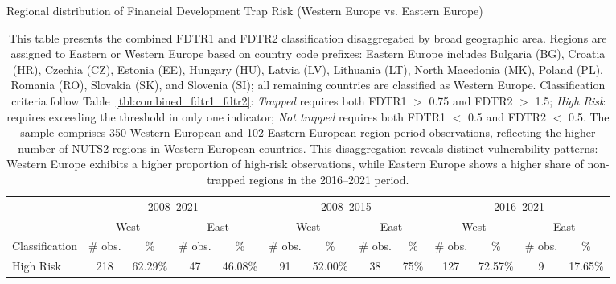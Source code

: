 \documentclass[a4paper,11pt,oneside]{article}
\begin{document}
\begin{table}%
\centering
\caption{Regional distribution of Financial Development Trap Risk (Western Europe vs. Eastern Europe)}
\vspace{-2mm}
\caption*{\footnotesize This table presents the combined FDTR1 and FDTR2 classification disaggregated by broad geographic area. Regions are assigned to Eastern or Western Europe based on country code prefixes: Eastern Europe includes Bulgaria (BG), Croatia (HR), Czechia (CZ), Estonia (EE), Hungary (HU), Latvia (LV), Lithuania (LT), North Macedonia (MK), Poland (PL), Romania (RO), Slovakia (SK), and Slovenia (SI); all remaining countries are classified as Western Europe. Classification criteria follow Table~\ref{tbl:combined_fdtr1_fdtr2}: \textit{Trapped} requires both FDTR1 $>$ 0.75 and FDTR2 $>$ 1.5; \textit{High Risk} requires exceeding the threshold in only one indicator; \textit{Not trapped} requires both FDTR1 $<$ 0.5 and FDTR2 $<$ 0.5. The sample comprises 350 Western European and 102 Eastern European region-period observations, reflecting the higher number of NUTS2 regions in Western European countries. This disaggregation reveals distinct vulnerability patterns: Western Europe exhibits a higher proportion of high-risk observations, while Eastern Europe shows a higher share of non-trapped regions in the 2016--2021 period.}
\label{tbl:east_west}
\footnotesize
\begin{tabular}{lcccccccccccc}
\toprule
               & \multicolumn{4}{c}{2008--2021}                              & \multicolumn{4}{c}{2008--2015}                                       & \multicolumn{4}{c}{2016--2021}                                       \\
\cmidrule(r){2-5}
\cmidrule(r){6-9}
\cmidrule(r){10-13}
               & \multicolumn{2}{c}{West}         & \multicolumn{2}{c}{East}         & \multicolumn{2}{c}{West}         & \multicolumn{2}{c}{East}         & \multicolumn{2}{c}{West}         & \multicolumn{2}{c}{East}         \\
\cmidrule(r){2-3}
\cmidrule(r){4-5}
\cmidrule(r){6-7}
\cmidrule(r){8-9}
\cmidrule(r){10-11}
\cmidrule(r){12-13}
Classification & \# obs. & \%      & \# obs. & \%      & \# obs. & \%      & \# obs. & \%      & \# obs. & \%      & \# obs. & \%      \\
\midrule
High Risk      & 218                    & 62.29\% & 47                     & 46.08\% & 91                     & 52.00\% & 38                     & 75\%    & 127                    & 72.57\% & 9                      & 17.65\% \\

\end{tabular}
\end{table}
\end{document}
